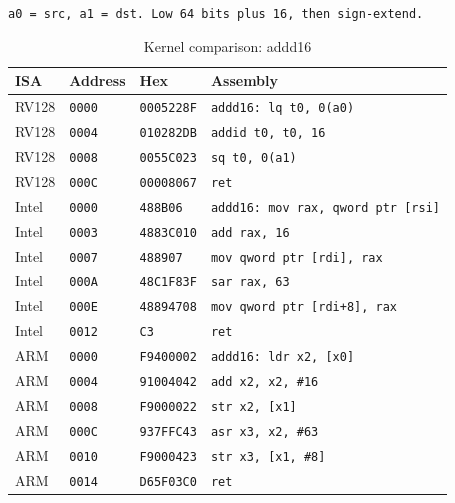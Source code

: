 \begin{table}[htbp]
\centering
\caption{Kernel comparison: addd16}
\begingroup
\scriptsize
\setlength{\tabcolsep}{4pt}
\noindent \texttt{a0 = src, a1 = dst. Low 64 bits plus 16, then sign-extend.}\par
\vspace{0.6ex}
\begin{tabular}{@{}l|l|l|p{7.2cm}@{}}
\toprule
ISA & Address & Hex & Assembly \\
\midrule
RV128 & \texttt{0000} & \texttt{0005228F} & \texttt{addd16: lq t0, 0(a0)} \\
RV128 & \texttt{0004} & \texttt{010282DB} & \texttt{addid t0, t0, 16} \\
RV128 & \texttt{0008} & \texttt{0055C023} & \texttt{sq t0, 0(a1)} \\
RV128 & \texttt{000C} & \texttt{00008067} & \texttt{ret} \\
\midrule
Intel & \texttt{0000} & \texttt{488B06} & \texttt{addd16: mov rax, qword ptr [rsi]} \\
Intel & \texttt{0003} & \texttt{4883C010} & \texttt{add rax, 16} \\
Intel & \texttt{0007} & \texttt{488907} & \texttt{mov qword ptr [rdi], rax} \\
Intel & \texttt{000A} & \texttt{48C1F83F} & \texttt{sar rax, 63} \\
Intel & \texttt{000E} & \texttt{48894708} & \texttt{mov qword ptr [rdi+8], rax} \\
Intel & \texttt{0012} & \texttt{C3} & \texttt{ret} \\
\midrule
ARM & \texttt{0000} & \texttt{F9400002} & \texttt{addd16: ldr x2, [x0]} \\
ARM & \texttt{0004} & \texttt{91004042} & \texttt{add x2, x2, \#16} \\
ARM & \texttt{0008} & \texttt{F9000022} & \texttt{str x2, [x1]} \\
ARM & \texttt{000C} & \texttt{937FFC43} & \texttt{asr x3, x2, \#63} \\
ARM & \texttt{0010} & \texttt{F9000423} & \texttt{str x3, [x1, \#8]} \\
ARM & \texttt{0014} & \texttt{D65F03C0} & \texttt{ret} \\
\bottomrule
\end{tabular}
\endgroup
\end{table}
\noindent{}\par

